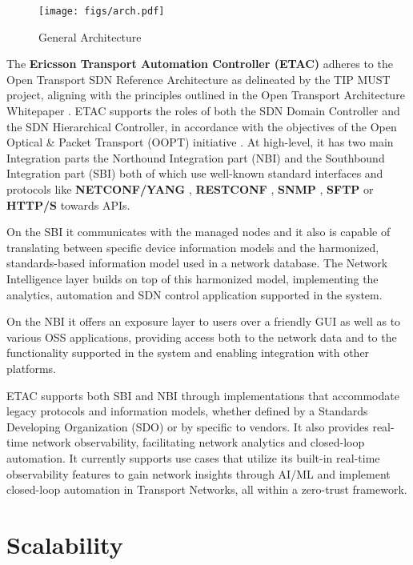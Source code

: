 \documentclass[10pt,sigconf]{iabart}
\begin{document}
\begin{figure}[h]
  \centering
  \texttt{[image: figs/arch.pdf]}
  \caption{General Architecture}
  \label{fig:overall_architecture}
\end{figure}

The \textbf{Ericsson Transport Automation Controller (ETAC)} \cite{ericsson-etac} adheres to the Open Transport SDN Reference Architecture as delineated by the TIP MUST project, aligning with the principles outlined in the Open Transport Architecture Whitepaper \cite{open_transport_architecture_whitepaper}. ETAC supports the roles of both the SDN Domain Controller and the SDN Hierarchical Controller, in accordance with the objectives of the Open Optical \& Packet Transport (OOPT) initiative \cite{oopt}. At high-level, it has two main Integration parts the Northound Integration part (NBI) and the Southbound Integration part (SBI) both of which use well-known standard interfaces and protocols like \textbf{NETCONF/YANG} \cite{RFC6241, rfc6020}, \textbf{RESTCONF} \cite{RFC8040}, \textbf{SNMP} \cite{RFC1157}, \textbf{SFTP} \cite{RFC4253} or \textbf{HTTP/S} \cite{RFC7230} towards APIs.

On the SBI it communicates with the managed nodes and it also is capable of translating between specific device information models and the harmonized, standards-based information model used in a network database. The Network Intelligence layer builds on top of this harmonized model, implementing the analytics, automation and SDN control application supported in the system. 

On the NBI it offers an exposure layer to users over a friendly GUI as well as to various OSS applications, providing access both to the network data and to the functionality supported in the system and enabling integration with other platforms. 

ETAC supports both SBI and NBI through implementations that accommodate legacy protocols and information models, whether defined by a Standards Developing Organization (SDO) or by specific to vendors. It also provides real-time network observability, facilitating network analytics and closed-loop automation. It currently supports use cases that utilize its built-in real-time observability features to gain network insights through AI/ML and implement closed-loop automation in Transport Networks, all within a zero-trust framework.

\section{Scalability} \label{scalability}
\end{document}
